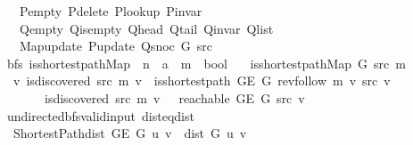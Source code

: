 \begin{isabellebody}
\ \ \ \ P{\isacharunderscore}{\kern0pt}empty\ P{\isacharunderscore}{\kern0pt}delete\ P{\isacharunderscore}{\kern0pt}lookup\ P{\isacharunderscore}{\kern0pt}invar\isanewline
\ \ \ \ Q{\isacharunderscore}{\kern0pt}empty\ Q{\isacharunderscore}{\kern0pt}is{\isacharunderscore}{\kern0pt}empty\ Q{\isacharunderscore}{\kern0pt}head\ Q{\isacharunderscore}{\kern0pt}tail\ Q{\isacharunderscore}{\kern0pt}invar\ Q{\isacharunderscore}{\kern0pt}list\isanewline
\ \ \ \ Map{\isacharunderscore}{\kern0pt}update\ P{\isacharunderscore}{\kern0pt}update\ Q{\isacharunderscore}{\kern0pt}snoc\ G\ src{\isachardoublequoteclose}\isanewline
\isanewline
{}\isamarkupfalse%
\ {\isacharparenleft}{\kern0pt}\ bfs{\isacharparenright}{\kern0pt}\ is{\isacharunderscore}{\kern0pt}shortest{\isacharunderscore}{\kern0pt}path{\isacharunderscore}{\kern0pt}Map\ {\isacharcolon}{\kern0pt}{\isacharcolon}{\kern0pt}\ {\isachardoublequoteopen}{\isacharprime}{\kern0pt}n\ {\isasymRightarrow}\ {\isacharprime}{\kern0pt}a\ {\isasymRightarrow}\ {\isacharprime}{\kern0pt}m\ {\isasymRightarrow}\ bool{\isachardoublequoteclose}\ \isanewline
\ \ {\isachardoublequoteopen}is{\isacharunderscore}{\kern0pt}shortest{\isacharunderscore}{\kern0pt}path{\isacharunderscore}{\kern0pt}Map\ G\ src\ m\ {\isasymequiv}\isanewline
\ \ \ {\isasymforall}v{\isachardot}{\kern0pt}\ {\isacharparenleft}{\kern0pt}is{\isacharunderscore}{\kern0pt}discovered\ src\ m\ v\ {\isasymlongrightarrow}\ is{\isacharunderscore}{\kern0pt}shortest{\isacharunderscore}{\kern0pt}path\ {\isacharparenleft}{\kern0pt}G{\isachardot}{\kern0pt}E\ G{\isacharparenright}{\kern0pt}\ {\isacharparenleft}{\kern0pt}rev{\isacharunderscore}{\kern0pt}follow\ m\ v{\isacharparenright}{\kern0pt}\ src\ v{\isacharparenright}{\kern0pt}\ {\isasymand}\isanewline
\ \ \ \ \ \ \ {\isacharparenleft}{\kern0pt}{\isasymnot}\ is{\isacharunderscore}{\kern0pt}discovered\ src\ m\ v\ {\isasymlongrightarrow}\ {\isasymnot}\ reachable\ {\isacharparenleft}{\kern0pt}G{\isachardot}{\kern0pt}E\ G{\isacharparenright}{\kern0pt}\ src\ v{\isacharparenright}{\kern0pt}{\isachardoublequoteclose}\isanewline
\isanewline
{}\isamarkupfalse%
\ {\isacharparenleft}{\kern0pt}\ undirected{\isacharunderscore}{\kern0pt}bfs{\isacharunderscore}{\kern0pt}valid{\isacharunderscore}{\kern0pt}input{\isacharparenright}{\kern0pt}\ dist{\isacharunderscore}{\kern0pt}eq{\isacharunderscore}{\kern0pt}dist{\isacharcolon}{\kern0pt}\isanewline
\ \ \ {\isachardoublequoteopen}Shortest{\isacharunderscore}{\kern0pt}Path{\isachardot}{\kern0pt}dist\ {\isacharparenleft}{\kern0pt}G{\isachardot}{\kern0pt}E\ G{\isacharparenright}{\kern0pt}\ u\ v\ {\isacharequal}{\kern0pt}\ dist\ G\ u\ v{\isachardoublequoteclose}%

\end{isabellebody}
